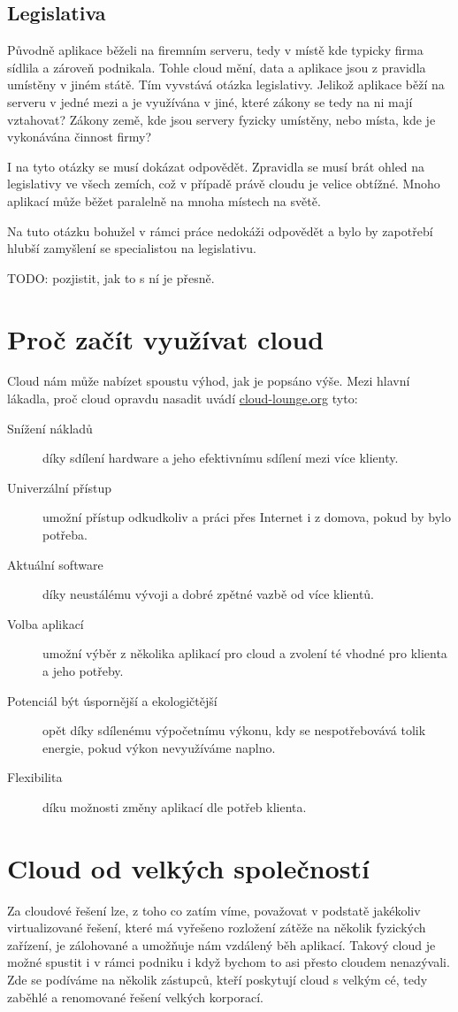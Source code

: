 \subsection{Legislativa}
Původně aplikace běželi na firemním serveru, tedy v místě kde typicky firma sídlila a zároveň podnikala. Tohle cloud mění, data a aplikace jsou z pravidla umístěny v jiném státě. Tím vyvstává otázka legislativy. Jelikož aplikace běží na serveru v jedné mezi a je využívána v jiné, které zákony se tedy na ni mají vztahovat? Zákony země, kde jsou servery fyzicky umístěny, nebo místa, kde je vykonávána činnost firmy?

I na tyto otázky se musí dokázat odpovědět. Zpravidla se musí brát ohled na legislativy ve všech zemích, což v případě právě cloudu je velice obtížné. Mnoho aplikací může běžet paralelně na mnoha místech na světě.

Na tuto otázku bohužel v rámci práce nedokáži odpovědět a bylo by zapotřebí hlubší zamyšlení se specialistou na legislativu.

TODO: pozjistit, jak to s ní je přesně.

\section{Proč začít využívat cloud}
Cloud nám může nabízet spoustu výhod, jak je popsáno výše. Mezi hlavní lákadla, proč cloud opravdu nasadit uvádí \href{http://www.cloud-lounge.org/why-use-clouds.html}{cloud-lounge.org}\cite{cloudlounge:ProcCloud} tyto:
\begin{description}
	\item [Snížení nákladů] díky sdílení hardware a jeho efektivnímu sdílení mezi více klienty.
	\item [Univerzální přístup] umožní přístup odkudkoliv a práci přes Internet i z domova, pokud by bylo potřeba.
	\item [Aktuální software] díky neustálému vývoji a dobré zpětné vazbě od více klientů.
	\item [Volba aplikací] umožní výběr z několika aplikací pro cloud a zvolení té vhodné pro klienta a jeho potřeby.
	\item [Potenciál být úspornější a ekologičtější] opět díky sdílenému výpočetnímu výkonu, kdy se nespotřebovává tolik energie, pokud výkon nevyužíváme naplno.
	\item [Flexibilita] díku možnosti změny aplikací dle potřeb klienta.
\end{description}

\section{Cloud od velkých společností}
Za cloudové řešení lze, z toho co zatím víme, považovat v podstatě jakékoliv virtualizované řešení, které má vyřešeno rozložení zátěže na několik fyzických zařízení, je zálohované a umožňuje nám vzdálený běh aplikací. Takový cloud je možné spustit i v rámci podniku i když bychom to asi přesto cloudem nenazývali. Zde se podíváme na několik zástupců, kteří poskytují cloud s velkým cé, tedy zaběhlé a renomované řešení velkých korporací.

